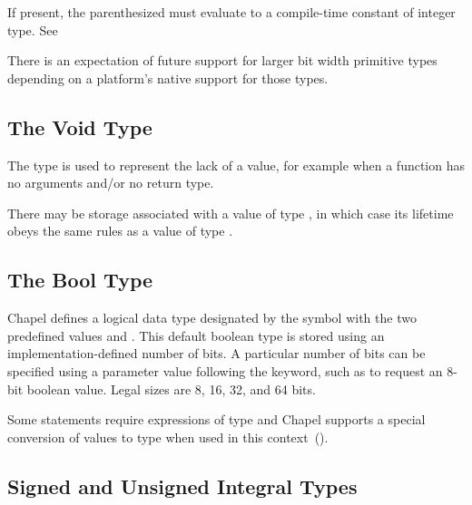 If present, the parenthesized  must
evaluate to a compile-time constant of integer type.  See~

\begin{openissue}
There is an expectation of future support for larger bit width
primitive types depending on a platform's native support for those
types.
\end{openissue}

\subsection{The Void Type}
\label{The_Void_Type}

The  type is used to represent the lack of a value, for
example when a function has no arguments and/or no return type.  

There may be storage associated with a value of type , in which
case its lifetime obeys the same rules as a value of type .

\subsection{The Bool Type}
\label{The_Bool_Type}

Chapel defines a logical data type designated by the symbol
 with the two predefined values  and
.  This default boolean type is stored using an
implementation-defined number of bits.  A particular number of bits
can be specified using a parameter value following the 
keyword, such as  to request an 8-bit boolean value.
Legal sizes are 8, 16, 32, and 64 bits.


Some statements require expressions of  type and Chapel
supports a special conversion of values to  type when used
in this context~().

\subsection{Signed and Unsigned Integral Types}
\label{Signed_and_Unsigned_Integral_Types}

